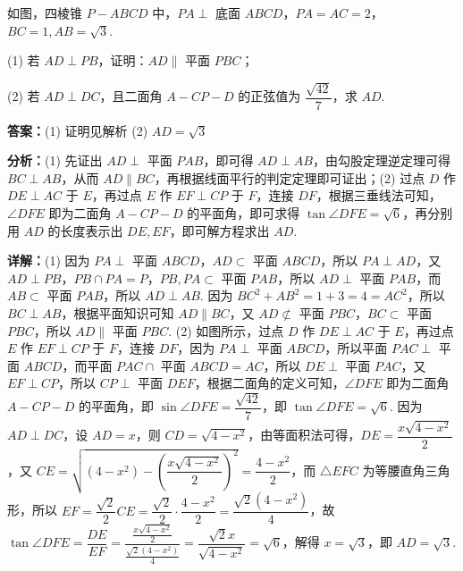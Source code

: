 \begin{question}[points=15]
如图，四棱锥 $P-ABCD$ 中，$PA\perp$ 底面 $ABCD$，$PA=AC=2$，$BC=1, AB=\sqrt{3}$.

(1) 若 $AD\perp PB$，证明：$AD\parallel$ 平面 $PBC$；

(2) 若 $AD\perp DC$，且二面角 $A-CP-D$ 的正弦值为 $\dfrac{\sqrt{42}}{7}$，求 $AD$.
\begin{solution}
\textbf{答案：}(1) 证明见解析 (2) $AD=\sqrt{3}$

\textbf{分析：}(1) 先证出 $AD\perp$ 平面 $PAB$，即可得 $AD\perp AB$，由勾股定理逆定理可得 $BC\perp AB$，从而 $AD\parallel BC$，再根据线面平行的判定定理即可证出；(2) 过点 $D$ 作 $DE\perp AC$ 于 $E$，再过点 $E$ 作 $EF\perp CP$ 于 $F$，连接 $DF$，根据三垂线法可知，$\angle DFE$ 即为二面角 $A-CP-D$ 的平面角，即可求得 $\tan\angle DFE=\sqrt{6}$，再分别用 $AD$ 的长度表示出 $DE,EF$，即可解方程求出 $AD$.

\textbf{详解：}(1) 因为 $PA\perp$ 平面 $ABCD$，$AD\subset$ 平面 $ABCD$，所以 $PA\perp AD$，又 $AD\perp PB$，$PB\cap PA=P$，$PB,PA\subset$ 平面 $PAB$，所以 $AD\perp$ 平面 $PAB$，而 $AB\subset$ 平面 $PAB$，所以 $AD\perp AB$. 因为 $BC^2+AB^2=1+3=4=AC^2$，所以 $BC\perp AB$，根据平面知识可知 $AD\parallel BC$，又 $AD\not\subset$ 平面 $PBC$，$BC\subset$ 平面 $PBC$，所以 $AD\parallel$ 平面 $PBC$.
(2) 如图所示，过点 $D$ 作 $DE\perp AC$ 于 $E$，再过点 $E$ 作 $EF\perp CP$ 于 $F$，连接 $DF$，因为 $PA\perp$ 平面 $ABCD$，所以平面 $PAC\perp$ 平面 $ABCD$，而平面 $PAC\cap$ 平面 $ABCD=AC$，所以 $DE\perp$ 平面 $PAC$，又 $EF\perp CP$，所以 $CP\perp$ 平面 $DEF$，根据二面角的定义可知，$\angle DFE$ 即为二面角 $A-CP-D$ 的平面角，即 $\sin\angle DFE=\dfrac{\sqrt{42}}{7}$，即 $\tan\angle DFE=\sqrt{6}$. 因为 $AD\perp DC$，设 $AD=x$，则 $CD=\sqrt{4-x^2}$，由等面积法可得，$DE=\dfrac{x\sqrt{4-x^2}}{2}$，又 $CE=\sqrt{(4-x^2)-\left(\dfrac{x\sqrt{4-x^2}}{2}\right)^2}=\dfrac{4-x^2}{2}$，而 $\triangle EFC$ 为等腰直角三角形，所以 $EF=\dfrac{\sqrt{2}}{2}CE=\dfrac{\sqrt{2}}{2}\cdot\dfrac{4-x^2}{2}=\dfrac{\sqrt{2}(4-x^2)}{4}$，故 $\tan\angle DFE=\dfrac{DE}{EF}=\dfrac{\frac{x\sqrt{4-x^2}}{2}}{\frac{\sqrt{2}(4-x^2)}{4}}=\dfrac{\sqrt{2}x}{\sqrt{4-x^2}}=\sqrt{6}$，解得 $x=\sqrt{3}$，即 $AD=\sqrt{3}$.
\end{solution}
\end{question}

